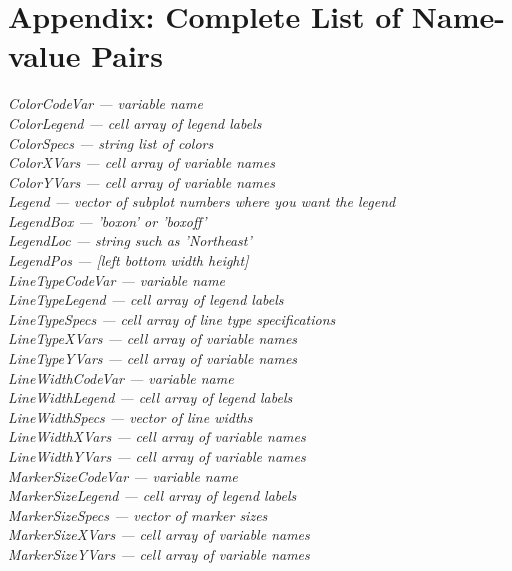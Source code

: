 \documentclass{article}
\newcommand{\namevalue}[2]{{\it #1 --- #2}}
\begin{document}
\appendix


\section{Appendix: Complete List of Name-value Pairs}

\namevalue{ColorCodeVar}{variable name} \\
\namevalue{ColorLegend}{cell array of legend labels} \\
\namevalue{ColorSpecs}{string list of colors} \\
\namevalue{ColorXVars}{cell array of variable names} \\
\namevalue{ColorYVars}{cell array of variable names} \\
\namevalue{Legend}{vector of subplot numbers where you want the legend} \\
\namevalue{LegendBox}{'boxon' or 'boxoff'} \\
\namevalue{LegendLoc}{string such as 'Northeast'} \\
\namevalue{LegendPos}{[left bottom width height]} \\
\namevalue{LineTypeCodeVar}{variable name} \\
\namevalue{LineTypeLegend}{cell array of legend labels} \\
\namevalue{LineTypeSpecs}{cell array of line type specifications} \\
\namevalue{LineTypeXVars}{cell array of variable names} \\
\namevalue{LineTypeYVars}{cell array of variable names} \\
\namevalue{LineWidthCodeVar}{variable name} \\
\namevalue{LineWidthLegend}{cell array of legend labels} \\
\namevalue{LineWidthSpecs}{vector of line widths} \\
\namevalue{LineWidthXVars}{cell array of variable names} \\
\namevalue{LineWidthYVars}{cell array of variable names} \\
\namevalue{MarkerSizeCodeVar}{variable name} \\
\namevalue{MarkerSizeLegend}{cell array of legend labels} \\
\namevalue{MarkerSizeSpecs}{vector of marker sizes} \\
\namevalue{MarkerSizeXVars}{cell array of variable names} \\
\namevalue{MarkerSizeYVars}{cell array of variable names} \\
\end{document}

